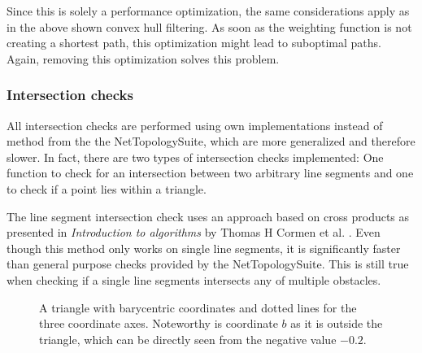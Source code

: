 			Since this is solely a performance optimization, the same considerations apply as in the above shown convex hull filtering.
			As soon as the weighting function is not creating a shortest path, this optimization might lead to suboptimal paths.
			Again, removing this optimization solves this problem.
			
		\subsubsection{Intersection checks}
		\label{subsubsec:intersection-checks}
			
			All intersection checks are performed using own implementations instead of method from the the NetTopologySuite, which are more generalized and therefore slower.
			In fact, there are two types of intersection checks implemented:
			One function to check for an intersection between two arbitrary line segments and one to check if a point lies within a triangle.
			
			The line segment intersection check uses an approach based on cross products as presented in \emph{Introduction to algorithms} by Thomas H Cormen et al. \cite[1018]{cormen-introduction-to-alg}.
			Even though this method only works on single line segments, it is significantly faster than general purpose checks provided by the NetTopologySuite.
			This is still true when checking if a single line segments intersects any of multiple obstacles.
			
			\begin{figure}[h]
				\begin{figcenter}
				\end{figcenter}
				\caption{A triangle with barycentric coordinates and dotted lines for the three coordinate axes. Noteworthy is coordinate $b$ as it is outside the triangle, which can be directly seen from the negative value $-0.2$.}
				\label{fig:barycentric-triangle}
			\end{figure}
			
